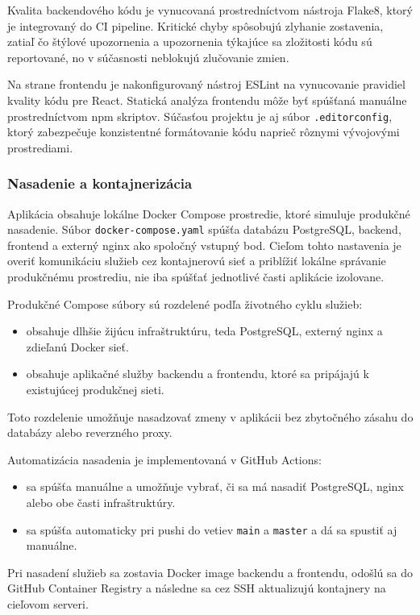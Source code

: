 Kvalita backendového kódu je vynucovaná prostredníctvom nástroja Flake8, ktorý je integrovaný do CI pipeline. Kritické chyby spôsobujú zlyhanie zostavenia, zatiaľ čo štýlové upozornenia a upozornenia týkajúce sa zložitosti kódu sú reportované, no v súčasnosti neblokujú zlučovanie zmien.

Na strane frontendu je nakonfigurovaný nástroj ESLint na vynucovanie pravidiel kvality kódu pre React. Statická analýza frontendu môže byť spúšťaná manuálne prostredníctvom npm skriptov. Súčasťou projektu je aj súbor \texttt{.editorconfig}, ktorý zabezpečuje konzistentné formátovanie kódu naprieč rôznymi vývojovými prostrediami.


\subsubsection{Nasadenie a kontajnerizácia}

Aplikácia obsahuje lokálne Docker Compose prostredie, ktoré simuluje produkčné nasadenie. Súbor \texttt{docker-compose.yaml} spúšťa databázu PostgreSQL, backend, frontend a externý nginx ako spoločný vstupný bod. Cieľom tohto nastavenia je overiť komunikáciu služieb cez kontajnerovú sieť a priblížiť lokálne správanie produkčnému prostrediu, nie iba spúšťať jednotlivé časti aplikácie izolovane.

Produkčné Compose súbory sú rozdelené podľa životného cyklu služieb:
\begin{itemize}
    \item {} obsahuje dlhšie žijúcu infraštruktúru, teda PostgreSQL, externý nginx a zdieľanú Docker sieť.
    \item {} obsahuje aplikačné služby backendu a frontendu, ktoré sa pripájajú k existujúcej produkčnej sieti.
\end{itemize}
Toto rozdelenie umožňuje nasadzovať zmeny v aplikácii bez zbytočného zásahu do databázy alebo reverzného proxy.

Automatizácia nasadenia je implementovaná v GitHub Actions:
\begin{itemize}
    \item {} sa spúšťa manuálne a umožňuje vybrať, či sa má nasadiť PostgreSQL, nginx alebo obe časti infraštruktúry.
    \item {} sa spúšťa automaticky pri pushi do vetiev \texttt{main} a \texttt{master} a dá sa spustiť aj manuálne.
\end{itemize}
Pri nasadení služieb sa zostavia Docker image backendu a frontendu, odošlú sa do GitHub Container Registry a následne sa cez SSH aktualizujú kontajnery na cieľovom serveri.

